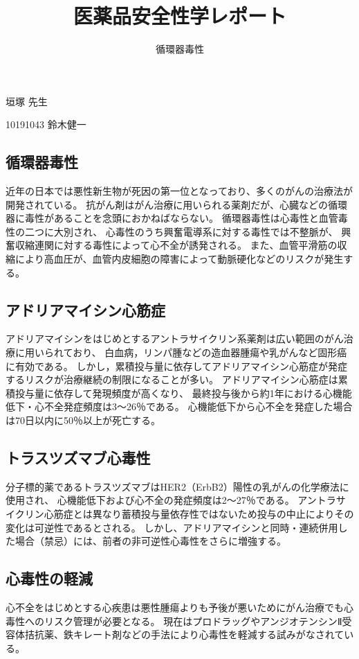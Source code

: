 \documentclass[a4paper,papersize,dvipdfmx]{jsarticle}
\begin{document}
\title{医薬品安全性学レポート}
\author{循環器毒性}
\date{}
\maketitle




\begin{flushright}
垣塚 先生

10191043 鈴木健一
\end{flushright}

\subsection*{循環器毒性}
近年の日本では悪性新生物が死因の第一位となっており、多くのがんの治療法が開発されている。
抗がん剤はがん治療に用いられる薬剤だが、心臓などの循環器に毒性があることを念頭におかねばならない。
循環器毒性は心毒性と血管毒性の二つに大別され、
心毒性のうち興奮電導系に対する毒性では不整脈が、
興奮収縮連関に対する毒性によって心不全が誘発される。
また、血管平滑筋の収縮により高血圧が、血管内皮細胞の障害によって動脈硬化などのリスクが発生する。

\subsection*{アドリアマイシン心筋症}
アドリアマイシンをはじめとするアントラサイクリン系薬剤は広い範囲のがん治療に用いられており、
白血病，リンパ腫などの造血器腫瘍や乳がんなど固形癌に有効である。
しかし，累積投与量に依存してアドリアマイシン心筋症が発症するリスクが治療継続の制限になることが多い。
アドリアマイシン心筋症は累積投与量に依存して発現頻度が高くなり、
最終投与後から約1年における心機能低下・心不全発症頻度は3〜26％である。
心機能低下から心不全を発症した場合は70日以内に50％以上が死亡する。

\subsection*{トラスツズマブ心毒性}
分子標的薬であるトラスツズマブはHER2（ErbB2）陽性の乳がんの化学療法に使用され、
心機能低下および心不全の発症頻度は2〜27％である。
アントラサイクリン心筋症とは異なり蓄積投与量依存性ではないため投与の中止によりその変化は可逆性であるとされる。
しかし、アドリアマイシンと同時・連続併用した場合（禁忌）には、前者の非可逆性心毒性をさらに増強する。

\subsection*{心毒性の軽減}
心不全をはじめとする心疾患は悪性腫瘍よりも予後が悪いためにがん治療でも心毒性へのリスク管理が必要となる。
現在はプロドラッグやアンジオテンシンⅡ受容体拮抗薬、鉄キレート剤などの手法により心毒性を軽減する試みがなされている。
\end{document}
